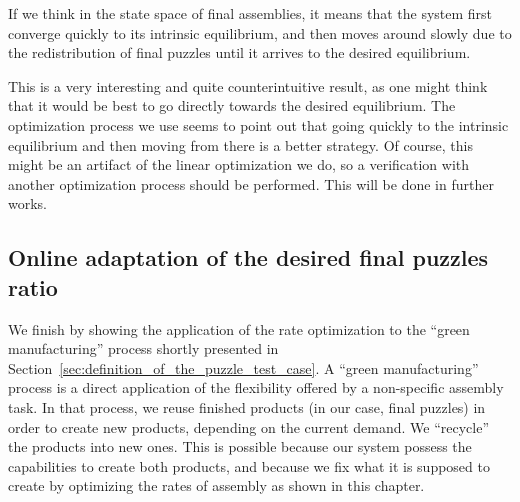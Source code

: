 		If we think in the state space of final assemblies, it means that the system first converge quickly to its intrinsic equilibrium, and then moves around slowly due to the redistribution of final puzzles until it arrives to the desired equilibrium.

		This is a very interesting and quite counterintuitive result, as one might think that it would be best to go directly towards the desired equilibrium. The optimization process we use seems to point out that going quickly to the intrinsic equilibrium and then moving from there is a better strategy. Of course, this might be an artifact of the linear optimization we do, so a verification with another optimization process should be performed. This will be done in further works.
	
	
	
	\subsection{Online adaptation of the desired final puzzles ratio} %
	\label{sub:online_adaptation_of_the_desired_final_puzzles_ratio}
		We finish by showing the application of the rate optimization to the ``green manufacturing'' process shortly presented in Section~\ref{sec:definition_of_the_puzzle_test_case}. A ``green manufacturing'' process is a direct application of the flexibility offered by a non-specific assembly task. In that process, we reuse finished products (in our case, final puzzles) in order to create new products, depending on the current demand. We ``recycle'' the products into new ones. This is possible because our system possess the capabilities to create both products, and because we fix what it is supposed to create by optimizing the rates of assembly as shown in this chapter.
		
